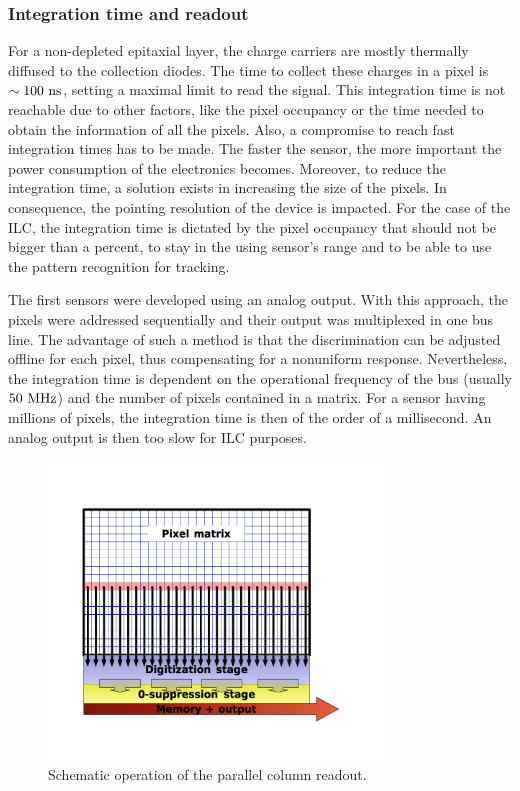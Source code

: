     \subsubsection{Integration time and readout}

    For a non-depleted epitaxial layer, the charge carriers are mostly thermally diffused to the collection diodes.
    The time to collect these charges in a pixel is $\sim 100~\rm{ns}$, setting a maximal limit to read the signal.
    This integration time is not reachable due to other factors, like the pixel occupancy or the time needed to obtain the information of all the pixels.
    Also, a compromise to reach fast integration times has to be made.
    The faster the sensor, the more important the power consumption of the electronics becomes.
    Moreover, to reduce the integration time, a solution exists in increasing the size of the pixels.
    In consequence, the pointing resolution of the device is impacted.
    For the case of the \gls{ILC}, the integration time is dictated by the pixel occupancy that should not be bigger than a percent, to stay in the using sensor's range and to be able to use the pattern recognition for tracking.

    The first sensors were developed using an analog output.
    With this approach, the pixels were addressed sequentially and their output was multiplexed in one bus line.
    The advantage of such a method is that the discrimination can be adjusted offline for each pixel, thus compensating for a nonuniform response.
    Nevertheless, the integration time is dependent on the operational frequency of the bus (usually $50~\rm{MHz}$) and the number of pixels contained in a matrix.
    For a sensor having millions of pixels, the integration time is then of the order of a millisecond.
    An analog output is then too slow for \gls{ILC} purposes. 
    
    \begin{figure}[!tbh]
      \centering
      \includegraphics[width = 0.8\textwidth]{Pictures/vxd/parallelColumnPrinciple_2bis.png}
      \caption{Schematic operation of the parallel column readout.}
      \label{fig:rollShut}
    \end{figure}
    
